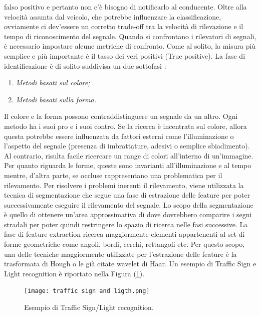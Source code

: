 falso positivo e pertanto non c'è bisogno di notificarlo al conducente. Oltre 
alla velocità assunta dal veicolo, che potrebbe influenzare la classificazione, 
ovviamente ci dev'essere un corretto trade-off tra la velocità di rilevazione e 
il tempo di riconoscimento del segnale. Quando si confrontano i rilevatori 
di segnali, è necessario impostare alcune metriche di confronto. Come al 
solito, la misura più semplice e più importante è il tasso dei veri positivi (True positive).
La fase di identificazione è di solito suddivisa un due sottofasi \cite{sign-rec}:
\begin{enumerate}
    \item \emph{Metodi basati sul colore;}
    \item \emph{Metodi basati sulla forma.}
\end{enumerate}
Il colore e la forma possono contraddistinguere un segnale da un altro.
Ogni metodo ha i suoi pro e i suoi contro. Se la ricerca è incentrata sul 
colore, allora questa potrebbe essere influenzata da fattori esterni come 
l'illuminazione o l'aspetto del segnale (presenza di imbrattature, adesivi 
o semplice sbiadimento). Al contrario, risulta facile ricercare un range di 
colori all'interno di un'immagine. Per quanto riguarda le forme, queste 
sono invarianti all'illuminazione e al tempo mentre, d'altra parte, se occluse 
rappresentano una problematica per il rilevamento. Per risolvere i problemi 
inerenti il rilevamento, viene utilizzata la tecnica di segmentazione che segue 
una fase di estrazione delle feature per poter successivamente eseguire il 
rilevamento del segnale. Lo scopo della segmentazione è quello di ottenere 
un'area approssimativa di dove dovrebbero comparire i segni stradali per 
poter quindi restringere lo spazio di ricerca nelle fasi successive. La fase 
di feature extraction ricerca maggiormente elementi appartenenti al set di 
forme geometriche come angoli, bordi, cerchi, rettangoli etc. Per questo 
scopo, una delle tecniche maggiormente utilizzate per l'estrazione delle 
feature è la trasformata di Hough o le già citate wavelet di Haar. Un 
esempio di Traffic Sign e Light recognition è riportato nella Figura (\ref{traffic sing-ligth}).
\begin{figure}
    \centering
    \texttt{[image: traffic sign and ligth.png]}
    \centering
    \caption{Esempio di Traffic Sign/Light recognition.}
    \label{traffic sing-ligth}
\end{figure}

